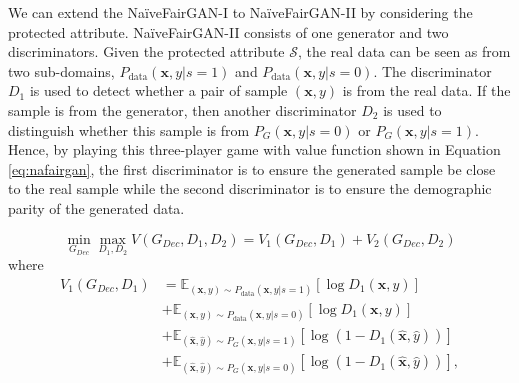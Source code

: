 \documentclass[sigconf]{acmart}
\theoremstyle{definition}
\begin{document}
We can extend the Na\"iveFairGAN-I to Na\"iveFairGAN-II by considering the protected attribute. Na\"iveFairGAN-II consists of one generator and two discriminators. Given the protected attribute $\mathcal{S}$, the real data can be seen as from two sub-domains, $P_{\text{data}}(\mathbf{x},y|s=1)$ and $P_{\text{data}}(\mathbf{x},y|s=0)$. The discriminator $D_1$ is used to detect whether a pair of sample $(\mathbf{x},y)$ is from the real data. If the sample is from the generator, then another discriminator $D_2$ is used to distinguish whether this sample is from $P_G (\mathbf{x},y|s=0)$ or $P_G (\mathbf{x},y|s=1)$. Hence, by playing this three-player game with value function shown in Equation \ref{eq:nafairgan}, the first discriminator is to ensure the generated sample be close to the real sample while the second discriminator is to ensure the demographic parity of the generated data. 

\begin{equation}
\label{eq:nafairgan}
	\min_{G_{Dec}} \max_{D_1,D_2}  V(G_{Dec}, D_1, D_2) =  V_1(G_{Dec}, D_1) + V_2(G_{Dec}, D_2)
\end{equation}
where
\begin{equation*}
\begin{split}
	 V_1 (G_{Dec}, D_1) &=  \mathbb{E}_{(\mathbf{x},y) \sim P_{\text{data}}(\mathbf{x},y|s=1)} {[\log D_1(\mathbf{x}, y)]} \\ 
	&+ \mathbb{E}_{(\mathbf{x},y) \sim P_{\text{data}}(\mathbf{x},y|s=0)} {[\log D_1(\mathbf{x}, y)]} \\
		 & + \mathbb{E}_{(\hat{\mathbf{x}},\hat{y}) \sim P_{G}(\mathbf{x},y|s=1)} {[\log (1 - D_1(\hat{\mathbf{x}},\hat{y}))]} \\
		 & + \mathbb{E}_{(\hat{\mathbf{x}},\hat{y}) \sim P_{G}(\mathbf{x},y|s=0)} {[\log (1 - D_1(\hat{\mathbf{x}},\hat{y}))]} ,
\end{split}
\end{equation*}
\end{document}

